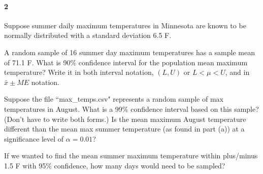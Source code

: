 \documentclass{article}
\begin{document}
\begin{flushleft}
\paragraph{2} Suppose summer daily maximum temperatures in Minnesota are known to be normally distributed with a standard deviation 6.5 \textdegree F. 
\begin{enumalpha}
\item A random sample of 16 summer day maximum temperatures has a sample mean of  71.1 \textdegree F. What is 90\% confidence interval for the population mean maximum temperature? Write it in both interval notation, $(L, U)$ or $L < \mu < U$, and in $\bar x \pm ME$ notation. 
\vspace{2.5in}
\item Suppose the file ``max\_temps.csv" represents a random sample of max temperatures in August. What is a 99\% confidence interval based on this sample? (Don't have to write both forms.) Is the mean maximum August temperature different than the mean max summer temperature (as found in part (a)) at a significance level of $\alpha = 0.01$?
\vspace{2.5in}
\item If we wanted to find the mean summer maximum temperature within plus/minus 1.5 \textdegree F with 95\% confidence, how many days would need to be sampled?
\end{enumalpha}



\end{flushleft}
\end{document}
